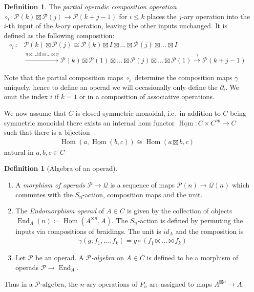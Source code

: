 \documentclass{scrartcl}
\theoremstyle{plain}
\theoremstyle{definition}
\newtheorem{definition}[theorem]{Definition}
\DeclareMathOperator{\Hom}{Hom}
\DeclareMathOperator*{\End}{End}
\newcommand{\iHom}{\underline{\operatorname{Hom}}}
\newcommand{\comp}{\circ}
\begin{document}
\begin{definition}The \emph{partial operadic composition operation} $\comp_i \colon \mathcal P(k) \boxtimes \mathcal P(j) \to \mathcal P(k+j-1)$ for $i \leq k$ places the $j$-ary operation into the $i$-th input of the $k$-ary operation, leaving the other inputs unchanged. It is defined as the following composition:  
\begin{align*}
    \comp_i\colon &\mathcal P(k) \boxtimes \mathcal P(j) \cong \mathcal P(k) \boxtimes I\boxtimes\dots\boxtimes \mathcal P(j) \boxtimes \dots\boxtimes I \\ &\xrightarrow{\eta\boxtimes \dots \mathrm{id} \boxtimes\dots\boxtimes \eta} \mathcal P(k) \boxtimes \mathcal P(1)\boxtimes\dots\boxtimes \mathcal P(j) \boxtimes \dots\boxtimes \mathcal P(1) \xrightarrow{\gamma} \mathcal P(k+j-1)
\end{align*}
\end{definition}
Note that the partial composition maps $\comp_i$ determine the composition maps $\gamma$ uniquely, hence to define an operad we will occasionally only define the $\partial_i$. We omit the index $i$ if $k=1$ or in a composition of associative operations. 

We now assume that $C$ is closed symmetric monoidal, i.e.\ in addition to $C$ being symmetric monoidal there exists an internal hom functor $\iHom \colon C \times C^{op} \to C$ such that there is a bijection
\begin{align*}
    \Hom(a, \iHom(b, c)) \cong \Hom(a \boxtimes b, c)
\end{align*}
natural in $a, b, c \in C$

\begin{definition}[Algebra of an operad]
    \begin{enumerate}[(1)]
        \item A \emph{morphism of operads} $\mathcal P \to \mathcal Q$ is a sequence of maps $\mathcal P(n) \to \mathcal Q(n)$ which commutes with the $S_n$-action, composition maps and the unit.

        \item
        The \emph{Endomorphism operad} of $A\in C$ is given by the collection of objects $\End_A(n) \coloneqq \iHom(A^{\boxtimes n}, A)$. The $S_n$-action is defined by permuting the inputs via compositions of braidings. The unit is $id_A$ and the composition is 
        \begin{align*}
            \gamma(g; f_1, \dots, f_k) = g \circ (f_1 \boxtimes \dots \boxtimes f_k)
        \end{align*}
        \item Let $\mathcal P$ be an operad. A \emph{$\mathcal P$-algebra} on $A\in C$ is defined to be a morphism of operads $\mathcal P \to \End_A$.
    \end{enumerate}
\end{definition}
Thus in a $\mathcal P$-algebra, the $n$-ary operations of $P_n$ are assigned to maps $A^{\boxtimes n} \to A$.
\end{document}
